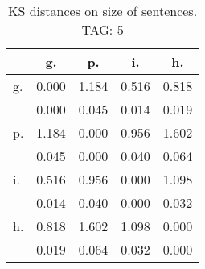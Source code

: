 \begin{table}[h!]
\begin{center}
\begin{tabular}{| l | c | c | c | c |}\hline
 & g. & p. & i. & h. \\\hline
g. & 0.000  & 1.184  & 0.516  & 0.818 \\\hline
 & 0.000  & 0.045  & 0.014  & 0.019 \\\hline
p. & 1.184  & 0.000  & 0.956  & 1.602 \\\hline
 & 0.045  & 0.000  & 0.040  & 0.064 \\\hline
i. & 0.516  & 0.956  & 0.000  & 1.098 \\\hline
 & 0.014  & 0.040  & 0.000  & 0.032 \\\hline
h. & 0.818  & 1.602  & 1.098  & 0.000 \\\hline
 & 0.019  & 0.064  & 0.032  & 0.000 \\\hline
\end{tabular}
\caption{KS distances on size of sentences. TAG: 5}
\end{center}
\end{table}
